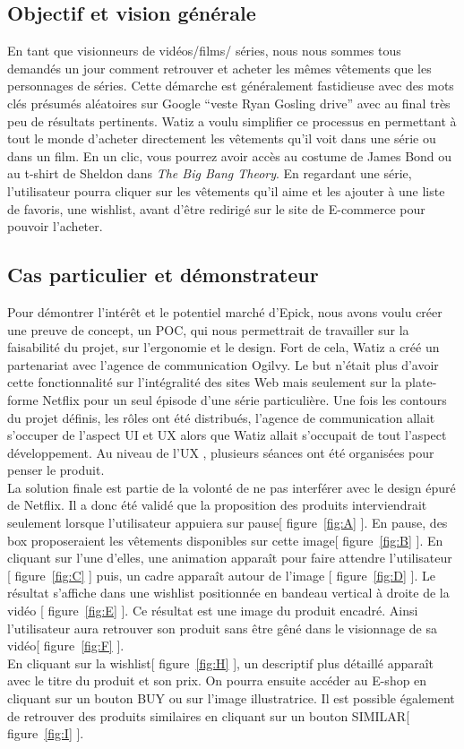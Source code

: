 \documentclass[a4paper, 12pt]{report}
\begin{document}
\subsection{Objectif et vision générale}
En tant que visionneurs de vidéos/films/ séries, nous nous sommes tous demandés un jour comment retrouver et acheter les mêmes vêtements que les personnages de séries. 
Cette démarche est généralement fastidieuse avec des mots clés présumés aléatoires sur Google “veste Ryan Gosling drive” avec au final très peu de résultats pertinents. 
Watiz a voulu simplifier ce processus en permettant à tout le monde d’acheter directement les vêtements qu'il voit dans une série ou dans un film. En un clic, vous pourrez avoir accès au costume de James Bond ou au t-shirt de Sheldon dans \textit{The Big Bang Theory}. 
En regardant une série, l’utilisateur pourra cliquer sur les vêtements qu’il aime et les ajouter à une liste de favoris, une wishlist, avant d'être redirigé sur le site de E-commerce pour pouvoir l’acheter. 

\subsection{Cas particulier et démonstrateur}\label{CP}
Pour démontrer l'intérêt et le potentiel marché d'Epick, nous avons voulu créer une preuve de concept, un POC, qui nous permettrait de travailler sur la faisabilité du projet, sur l'ergonomie et le design. 
Fort de cela, Watiz a créé un partenariat avec l’agence de communication Ogilvy. 
Le but n'était plus d’avoir cette fonctionnalité sur l'intégralité des sites Web mais seulement sur la plate-forme Netflix pour un seul épisode d'une série particulière. 
Une fois les contours du projet définis, les rôles ont été distribués, l’agence de communication allait s’occuper de l’aspect UI et UX alors que Watiz allait s’occupait de tout l’aspect développement. 
Au niveau de l’UX , plusieurs séances ont été organisées pour penser le produit.\\
\label{AN} La solution finale est partie de la volonté de ne pas interférer avec le design épuré de Netflix. Il a donc été validé que la proposition des produits interviendrait seulement lorsque l’utilisateur appuiera sur pause[ figure~\ref{fig:A} ]. En pause, des box proposeraient les vêtements disponibles sur cette image[ figure~\ref{fig:B} ]. En cliquant sur l'une d'elles, une animation apparaît pour faire attendre l’utilisateur [ figure~\ref{fig:C} ] puis, un cadre apparaît autour de l'image [ figure~\ref{fig:D} ]. Le résultat s’affiche dans une wishlist positionnée en bandeau vertical à droite de la vidéo [ figure~\ref{fig:E} ]. Ce résultat est une image du produit encadré. Ainsi l’utilisateur aura retrouver son produit sans être gêné dans le visionnage de sa vidéo[ figure~\ref{fig:F} ]. \\
En cliquant sur la wishlist[ figure~\ref{fig:H} ], un descriptif plus détaillé apparaît avec le titre du produit et son prix. On pourra ensuite accéder au E-shop en cliquant sur un bouton BUY ou sur l’image illustratrice. Il est possible également de retrouver des produits similaires en cliquant sur un bouton SIMILAR[ figure~\ref{fig:I} ].
\end{document}
